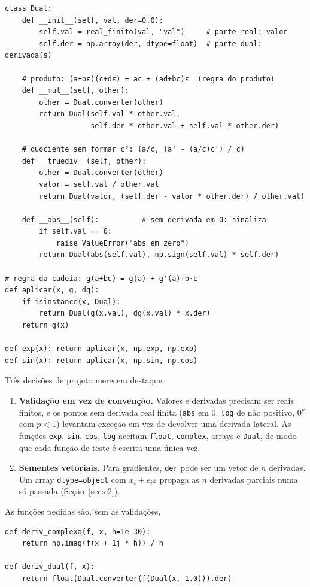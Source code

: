\documentclass[11pt,a4paper]{article}
\begin{document}
\begin{lstlisting}
class Dual:
    def __init__(self, val, der=0.0):
        self.val = real_finito(val, "val")     # parte real: valor
        self.der = np.array(der, dtype=float)  # parte dual: derivada(s)

    # produto: (a+bε)(c+dε) = ac + (ad+bc)ε  (regra do produto)
    def __mul__(self, other):
        other = Dual.converter(other)
        return Dual(self.val * other.val,
                    self.der * other.val + self.val * other.der)

    # quociente sem formar c²: (a/c, (a' - (a/c)c') / c)
    def __truediv__(self, other):
        other = Dual.converter(other)
        valor = self.val / other.val
        return Dual(valor, (self.der - valor * other.der) / other.val)

    def __abs__(self):          # sem derivada em 0: sinaliza
        if self.val == 0:
            raise ValueError("abs em zero")
        return Dual(abs(self.val), np.sign(self.val) * self.der)

# regra da cadeia: g(a+bε) = g(a) + g'(a)·b·ε
def aplicar(x, g, dg):
    if isinstance(x, Dual):
        return Dual(g(x.val), dg(x.val) * x.der)
    return g(x)

def exp(x): return aplicar(x, np.exp, np.exp)
def sin(x): return aplicar(x, np.sin, np.cos)
\end{lstlisting}

Três decisões de projeto merecem destaque:
\begin{enumerate}
\item \textbf{Validação em vez de convenção.} Valores e derivadas precisam ser reais finitos, e os pontos sem derivada real finita (\texttt{abs} em $0$, \texttt{log} de não positivo, $0^p$ com $p<1$) levantam exceção em vez de devolver uma derivada lateral. As funções \texttt{exp}, \texttt{sin}, \texttt{cos}, \texttt{log} aceitam \texttt{float}, \texttt{complex}, arrays e \texttt{Dual}, de modo que cada função de teste é escrita uma única vez.
\item \textbf{Sementes vetoriais.} Para gradientes, \texttt{der} pode ser um vetor de $n$ derivadas. Um array \texttt{dtype=object} com $x_i+e_i\varepsilon$ propaga as $n$ derivadas parciais numa só passada (Seção~\ref{sec:c2}).
\end{enumerate}

As funções pedidas são, sem as validações,
\begin{lstlisting}
def deriv_complexa(f, x, h=1e-30):
    return np.imag(f(x + 1j * h)) / h

def deriv_dual(f, x):
    return float(Dual.converter(f(Dual(x, 1.0))).der)
\end{lstlisting}
\end{document}
